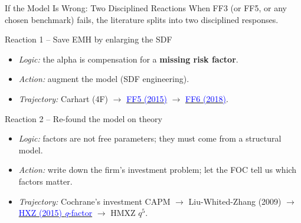 \documentclass{beamer}
\begin{document}
\begin{frame}{If the Model Is Wrong: Two Disciplined Reactions}
	When FF3 (or FF5, or any chosen benchmark) fails, the literature splits into two disciplined responses.
	\vspace{6pt}
	\begin{block}{Reaction 1 -- Save EMH by enlarging the SDF}
		\begin{itemize}
			\item \textit{Logic:} the alpha is compensation for a \textbf{missing risk factor}.
			\item \textit{Action:} augment the model (SDF engineering).
			\item \textit{Trajectory:} Carhart (4F) $\rightarrow$ \href{https://doi.org/10.1016/j.jfineco.2014.10.010}{\textcolor{blue}{FF5 (2015)}} $\rightarrow$ \href{https://doi.org/10.1016/j.jfineco.2018.02.012}{\textcolor{blue}{FF6 (2018)}}.
		\end{itemize}
	\end{block}
	\begin{block}{Reaction 2 -- Re-found the model on theory}
		\begin{itemize}
			\item \textit{Logic:} factors are not free parameters; they must come from a structural model.
			\item \textit{Action:} write down the firm's investment problem; let the FOC tell us which factors matter.
			\item \textit{Trajectory:} Cochrane's investment CAPM $\rightarrow$ Liu-Whited-Zhang (2009) $\rightarrow$ \href{https://doi.org/10.1093/rfs/hhu068}{\textcolor{blue}{HXZ (2015) \textit{q}-factor}} $\rightarrow$ HMXZ $q^5$.
		\end{itemize}
	\end{block}
\end{frame}
\end{document}
